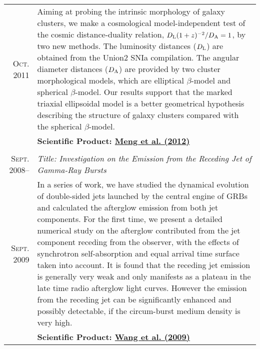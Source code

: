 \documentclass[10pt]{article}
\begin{document}
\begin{longtable}{r|p{17cm}}
  \textsc{Oct. 2011}     &   \small{Aiming at probing the intrinsic morphology of galaxy clusters, we make a cosmological
  model-independent test of the cosmic distance-duality relation, $D_{\rm L}(1+z)^{-2}/D_{\rm A}=1$, by two new methods. The
  luminosity distances ($D_{\rm L}$) are obtained from the Union2 SNIa compilation. The angular diameter distances ($D_{\rm A}$) are
  provided by two cluster morphological models, which are elliptical $\beta$-model and spherical $\beta$-model. Our results support
  that the marked triaxial ellipsoidal model is a better geometrical hypothesis describing the structure of galaxy clusters compared
  with the spherical $\beta$-model.}    \\
  &   \textbf{Scientific Product: \hyperlink{12.meng.apj}{Meng et al. (2012)}} \\
  \multicolumn{2}{c}{} \\
  \textsc{Sept. 2008}--  &   \emph{Title: Investigation on the Emission from the Receding Jet of Gamma-Ray Bursts}   \\
  \textsc{Sept. 2009}    &   \small{In a series of work, we have studied the dynamical evolution of double-sided jets launched by the central engine of GRBs and calculated the afterglow emission from both jet components. For the first time, we present a detailed numerical study on the afterglow contributed from the jet component receding from the observer, with the effects of synchrotron self-absorption and equal arrival time surface taken into account. It is found that the receding jet emission is generally very weak and only manifests as a plateau in the late time radio afterglow light curves. However the emission from the receding jet can be significantly enhanced and possibly detectable, if the circum-burst medium density is very high.} \\
  &   \textbf{Scientific Product: \hyperlink{09.wang.aa}{Wang et al. (2009)}} \\
\end{longtable}


\end{document}
